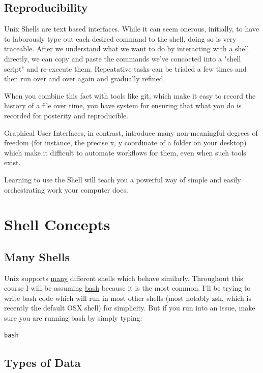 \documentclass[11pt]{article}
\begin{document}
\subsection{Reproducibility}
\label{sec:org635c84b}

Unix Shells are text based interfaces. While it can seem onerous,
initially, to have to laborously type out each desired command to the
shell, doing so is very traceable. After we understand what we want to
do by interacting with a shell directly, we can copy and paste the
commands we've concocted into a "shell script" and re-execute
them. Repeatative tasks can be trialed a few times and then run over
and over again and gradually refined. 

When you combine this fact with tools like git, which make it easy to
record the history of a file over time, you have system for ensuring
that what you do is recorded for posterity and reproducible. 

Graphical User Interfaces, in contrast, introduce many non-meaningful
degrees of freedom (for instance, the precise x, y coordinate of a
folder on your desktop) which make it difficult to automate workflows
for them, even when such tools exist. 

Learning to use the Shell will teach you a powerful way of simple and
easily orchestrating work your computer does.

\section{Shell Concepts}
\label{sec:org42082e9}

\subsection{Many Shells}
\label{sec:orga9e1078}

Unix supports \uline{many} different shells which behave
similarly. Throughout this course I will be assuming \href{https://en.wikipedia.org/wiki/Bash\_(Unix\_shell)}{bash} because it
is the most common. I'll be trying to write bash code which will run
in most other shells (most notably zsh, which is recently the default
OSX shell) for simplicity. But if you run into an issue, make sure you
are running bash by simply typing:

\begin{verbatim}
bash
\end{verbatim}

\subsection{Types of Data}
\label{sec:org0024568}
\end{document}
